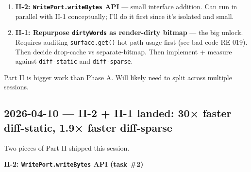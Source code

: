 \begin{enumerate}
\def\labelenumi{\arabic{enumi}.}
\tightlist
\item
  \textbf{II-2: \texttt{W\allowbreak{}r\allowbreak{}i\allowbreak{}t\allowbreak{}e\allowbreak{}P\allowbreak{}o\allowbreak{}r\allowbreak{}t\allowbreak{}.\allowbreak{}w\allowbreak{}r\allowbreak{}i\allowbreak{}t\allowbreak{}e\allowbreak{}B\allowbreak{}y\allowbreak{}t\allowbreak{}e\allowbreak{}s} API} --- small interface addition. Can run in parallel with II-1 conceptually; I'll do it first since it's isolated and small.
\item
  \textbf{II-1: Repurpose \texttt{d\allowbreak{}i\allowbreak{}r\allowbreak{}t\allowbreak{}y\allowbreak{}W\allowbreak{}o\allowbreak{}r\allowbreak{}d\allowbreak{}s} as render-dirty bitmap} --- the big unlock. Requires auditing \texttt{s\allowbreak{}u\allowbreak{}r\allowbreak{}f\allowbreak{}a\allowbreak{}c\allowbreak{}e\allowbreak{}.\allowbreak{}g\allowbreak{}e\allowbreak{}t\allowbreak{}(\allowbreak{})} hot-path usage first (see bad-code RE-019). Then decide drop-cache vs separate-bitmap. Then implement + measure against \texttt{d\allowbreak{}i\allowbreak{}f\allowbreak{}f\allowbreak{}-\allowbreak{}s\allowbreak{}t\allowbreak{}a\allowbreak{}t\allowbreak{}i\allowbreak{}c} and \texttt{d\allowbreak{}i\allowbreak{}f\allowbreak{}f\allowbreak{}-\allowbreak{}s\allowbreak{}p\allowbreak{}a\allowbreak{}r\allowbreak{}s\allowbreak{}e}.
\end{enumerate}

Part II is bigger work than Phase A. Will likely need to split across multiple sessions.

\subsection{2026-04-10 --- II-2 + II-1 landed: 30× faster diff-static, 1.9× faster diff-sparse}\label{record-422-ii-2-ii-1-landed-30-faster-diff-static-1.9-faster-diff-sparse}

Two pieces of Part II shipped this session.

\textbf{II-2: \texttt{W\allowbreak{}r\allowbreak{}i\allowbreak{}t\allowbreak{}e\allowbreak{}P\allowbreak{}o\allowbreak{}r\allowbreak{}t\allowbreak{}.\allowbreak{}w\allowbreak{}r\allowbreak{}i\allowbreak{}t\allowbreak{}e\allowbreak{}B\allowbreak{}y\allowbreak{}t\allowbreak{}e\allowbreak{}s} API (task \#2)}

